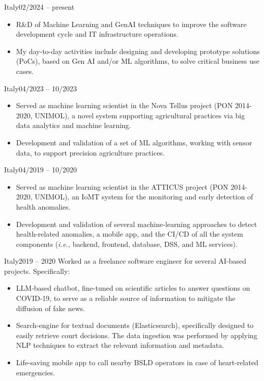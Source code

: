 
	{Italy}{02/2024 – present}
	\begin{itemize}
		\item R\&D of Machine Learning and GenAI techniques to improve the software development cycle and IT infrastructure operations.
		\item My day-to-day activities include designing and developing prototype solutions (PoCs), based on Gen AI and/or ML algorithms, to solve critical business use cases.
	\end{itemize}
		
	\medskip

	{Italy}{04/2023 – 10/2023}
	\begin{itemize}
            \item Served as machine learning scientist in the Nova Tellus project (PON 2014-2020, UNIMOL), a novel system supporting agricultural practices via big data analytics and machine learning.
            \item Development and validation of a set of ML algorithms, working with sensor data, to support precision agriculture practices.
	\end{itemize}
	
	\medskip
	
	{Italy}{04/2019 – 10/2020}
	\begin{itemize}
		\item Served as machine learning scientist in the ATTICUS project (PON 2014-2020, UNIMOL), an IoMT system for the monitoring and early detection of health anomalies.
		\item Development and validation of several machine-learning approaches to detect health-related anomalies, a mobile app, and the CI/CD of all the system components (\emph{i.e.,} backend, frontend, database, DSS, and ML services).
	\end{itemize}

	\medskip

	{Italy}{2019 – 2020}
	Worked as a freelance software engineer for several AI-based projects. Specifically:

	\begin{itemize}

		\item LLM-based chatbot, fine-tuned on scientific articles to answer questions on COVID-19, to serve as a reliable source of information to mitigate the diffusion of fake news.
		
		\item Search-engine for textual documents (Elasticsearch), specifically designed to easily retrieve court decisions. The data ingestion was performed by applying NLP techniques to extract the relevant information and metadata.
		
		\item Life-saving mobile app to call nearby BSLD operators in case of heart-related emergencies.
		
	\end{itemize}
